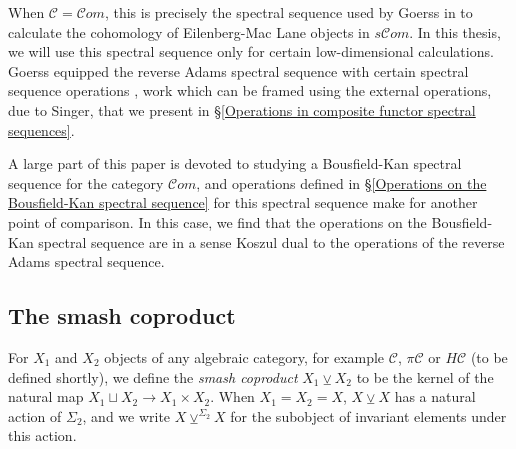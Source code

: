 \documentclass[11pt]{amsart} \renewcommand{\baselinestretch}{1.4}
\theoremstyle{plain}
\theoremstyle{definition}
\renewcommand{\to}{\longrightarrow}
\newcommand{\scrC}{\mathscr{C}}
\newcommand{\calc}{\mathcal{C}}
\newcommand{\citeBOX}[2][]{\cite[\mbox{#1}]{#2}}
\newcommand{\PA}[1]{\pi#1}
\newcommand{\HA}[1]{H#1}
\newcommand{\algs}{{\scrC\!\textit{om}}}
\newcommand{\smashcoprod}{\veebar}%
\begin{document}
\begin{Pi-algebras and cohomology algebras}
When $\calc=\algs$, this is precisely the spectral sequence used by Goerss in \cite[Chapter V]{MR1089001} to calculate the cohomology of Eilenberg-Mac Lane objects in $s\algs$. In this thesis, we will use this spectral sequence only for certain low-dimensional calculations. Goerss equipped the reverse Adams spectral sequence with certain spectral sequence operations \citeBOX[\S14]{MR1089001}, work which can be framed using the external operations, due to Singer, that we present in \S\ref{Operations in composite functor spectral sequences}.  %

A large part of this paper is devoted to studying a Bousfield-Kan spectral sequence for the category $\algs$, and operations defined in \S\ref{Operations on the Bousfield-Kan spectral sequence} for this spectral sequence make for another point of comparison. In this case, we find that the operations on the Bousfield-Kan spectral sequence are in a sense Koszul dual to the operations of the reverse Adams spectral sequence.

\subsection{The smash coproduct}\label{subseq:The smash coproduct}
For $X_1$ and $X_2$ objects of any algebraic category, for example $\calc$, $\PA{\calc}$ or $\HA{\calc}$ (to be defined shortly), we define the \emph{smash coproduct} $X_1\smashcoprod X_2$ to be the kernel of the natural map $X_1\sqcup X_2\to X_1\times X_2$. When $X_1=X_2=X$, $X\smashcoprod X$ has a natural action of $\Sigma_2$, and we write $X\smashcoprod^{\Sigma_2} X$ for the subobject of invariant elements under this action.


\end{Pi-algebras and cohomology algebras}
\end{document}
